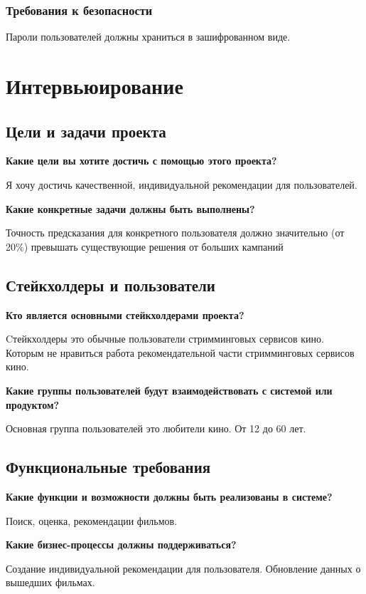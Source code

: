 \subsubsection{Требования к безопасности}
Пароли пользователей должны храниться в зашифрованном виде.

\clearpage

\section{Интервьюирование}
\subsection{Цели и задачи проекта}
\textbf{Какие цели вы хотите достичь с помощью этого проекта?} \par
Я хочу достичь качественной, индивидуальной рекомендации для пользователей. \par
\textbf{Какие конкретные задачи должны быть выполнены?} \par
Точность предсказания для конкретного пользователя должно значительно (от 20\%) превышать существующие решения от
больших кампаний

\subsection{Стейкхолдеры и пользователи}
\textbf{Кто является основными стейкхолдерами проекта?} \par
Cтейкхолдеры это обычные пользователи стримминговых сервисов кино.
Которым не нравиться работа рекомендательной части стримминговых сервисов кино.
\par
\textbf{Какие группы пользователей будут взаимодействовать с системой или продуктом?} \par
Основная группа пользователей это любители кино.
От 12 до 60 лет.

\subsection{Функциональные требования}
\textbf{Какие функции и возможности должны быть реализованы в системе?} \par
Поиск, оценка, рекомендации фильмов.
\par
\textbf{Какие бизнес-процессы должны поддерживаться?} \par
Создание индивидуальной рекомендации для пользователя.
Обновление данных о вышедших фильмах.


